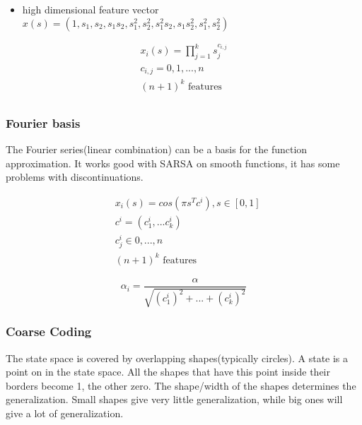 \begin{itemize}
	\item high dimensional feature vector $x(s)= (1, s_1, s_2, s_1s_2, s_1^2,s_2^2,s_1^2s_2,s_1s_2^2,s_1^2,s_2^2)$
\end{itemize}

\begin{equation}
\begin{split}
x_i(s) = \prod_{j=1}^{k}s_j^{c_{i,j}} \\
c_{i,j} = {0, 1, ..., n} \\
(n+1)^k \text{ features} \\
\end{split}
\label{eq:n ordered polynomial basis feature}
\end{equation}

\subsubsection{Fourier basis}
The Fourier series(linear combination) can be a basis for the function approximation. It works good with SARSA on smooth functions, it has some problems with discontinuations.

\begin{equation}
\begin{split}
& x_i(s) = cos(\pi s^Tc^i), s \in [0,1] \\
& c^i = (c_1^i, ... c_k^i)  \\
& c_j^i \in {0, ..., n} \\
& (n+1)^k \text{ features}
\end{split}
\label{eq:fourier basis}
\end{equation}

\begin{equation}
\alpha_i = \frac{\alpha}{\sqrt{(c_1^i)^2 + ... + (c_k^i)^2}}
\label{eq:step size TD with fourier approximation}
\end{equation}

\subsubsection{Coarse Coding}
The state space is covered by overlapping shapes(typically circles). A state is a point on in the state space. All the shapes that have this point inside their borders become 1, the other zero. The shape/width of the shapes determines the generalization. Small shapes give very little generalization, while big ones will give a lot of generalization.


